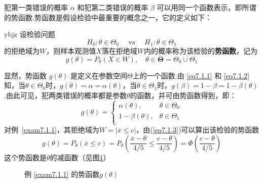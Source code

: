 犯第一类错误的概率 $\alpha$ 和犯第二类错误的概率 $\beta$ 可以用同一个函数表示，即所谓的势函数.势函数是假设检验中最重要的概念之一，它的定义如下：
\begin{definition}{}{ybjz}
	设检验问题
	\[H _ { 0 } : \theta \in \Theta _ { 0 } \quad \text { vs } \quad H _ { 1 } : \theta \in \Theta  _ { 1 }\]
	的拒绝域为$W$，则样本观测值$X$落在拒绝域$W$内的概率称为该检验的\textbf{势函数}，记为
	\begin{equation}\label{eq7.1.3}
	g\left(\theta\right)=P_{\theta}\left(X\in  W\right),\quad\theta\in\boldsymbol{\Theta }=\Theta_0\cup\Theta_1
	\end{equation}
\end{definition}
显然，势函数 $g(\theta)$ 是定义在参数空间$\Theta$上的一个函数.由 \eqref{eq7.1.1} 和 \eqref{eq7.1.2} 知，当$\theta \in \Theta_{ 0 }$时，$g ( \theta ) = \alpha = \alpha ( \theta )$，当$\theta \in \Theta_{1 }$时，$g ( \beta ) = 1-\beta = 1-\beta ( \theta )$.由此可见，犯两类错误的概率都是参数$\theta$的函数，并可由势函数得到，即：
\[
g\left(\theta\right)=\left\{\begin{matrix}
\alpha\left(\theta\right),&		\theta\in\Theta_0\\
1-\beta\left(\theta\right),&		\theta\in\Theta_1\\
\end{matrix}\right.
\]
对例~\ref{exam7.1.1}，其拒绝域为$W = | \overline{ x } \leq c |$，由(\ref{eq7.1.3})可以算出该检验的势函数
\[
g\left(\theta\right)=P_{\theta}\left(\overline{x}\leq c\right)=P_{\theta}\left(\frac{\overline{x}-\theta}{4/5}\le\frac{c-\theta}{4/5}\right)=\Phi\left(\frac{c-\theta}{4/5}\right)
\]
这个势函数是$\theta$的减函数（见图\ref{fig7.1.2}）
\begin{figure}[htbp]
	\centering
	\caption{例 \ref{exam7.1.1} 的势函数$g(\theta)$}\label{fig7.1.2}
\end{figure}


